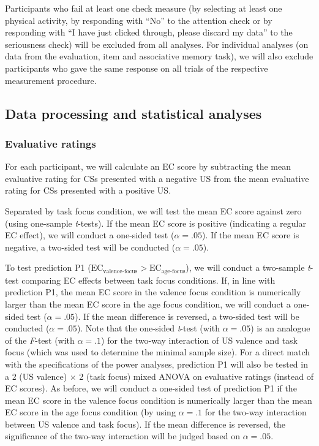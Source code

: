 \documentclass[
  doc,floatsintext]{apa6}
\begin{document}
Participants who fail at least one check measure (by selecting at least one physical activity, by responding with ``No'' to the attention check or by responding with ``I have just clicked through, please discard my data'' to the seriousness check) will be excluded from all analyses.
For individual analyses (on data from the evaluation, item and associative memory task), we will also exclude participants who gave the same response on all trials of the respective measurement procedure.

\subsection{Data processing and statistical analyses}\label{data-processing-and-statistical-analyses}

\subsubsection{Evaluative ratings}\label{evaluative-ratings}

For each participant, we will calculate an EC score by subtracting the mean evaluative rating for CSs presented with a negative US from the mean evaluative rating for CSs presented with a positive US.

Separated by task focus condition, we will test the mean EC score against zero (using one-sample \emph{t}-tests).
If the mean EC score is positive (indicating a regular EC effect), we will conduct a one-sided test (\(\alpha=.05\)).
If the mean EC score is negative, a two-sided test will be conducted (\(\alpha=.05\)).

To test prediction P1 (\(\textrm{EC}_\textrm{valence-focus}>\textrm{EC}_\textrm{age-focus}\)), we will conduct a two-sample \emph{t}-test comparing EC effects between task focus conditions.
If, in line with prediction P1, the mean EC score in the valence focus condition is numerically larger than the mean EC score in the age focus condition, we will conduct a one-sided test (\(\alpha=.05\)).
If the mean difference is reversed, a two-sided test will be conducted (\(\alpha=.05\)).
Note that the one-sided \emph{t}-test (with \(\alpha=.05\)) is an analogue of the \emph{F}-test (with \(\alpha=.1\)) for the two-way interaction of US valence and task focus (which was used to determine the minimal sample size).
For a direct match with the specifications of the power analyses, prediction P1 will also be tested in a 2 (US valence) \(\times\) 2 (task focus) mixed ANOVA on evaluative ratings (instead of EC scores).
As before, we will conduct a one-sided test of prediction P1 if the mean EC score in the valence focus condition is numerically larger than the mean EC score in the age focus condition (by using \(\alpha=.1\) for the two-way interaction between US valence and task focus).
If the mean difference is reversed, the significance of the two-way interaction will be judged based on \(\alpha=.05\).
\end{document}

